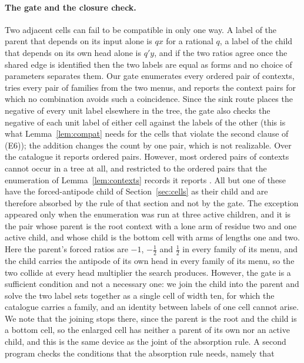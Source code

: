 \documentclass[11pt,a4paper]{article}
\theoremstyle{plain}
\theoremstyle{definition}
\theoremstyle{remark}
\begin{document}
\paragraph{The gate and the closure check.}
Two adjacent cells can fail to be compatible in only one way.  A label of the
parent that depends on its input alone is $qx$ for a rational $q$, a label of
the child that depends on its own head alone is $q'y$, and if the two ratios
agree once the shared edge is identified then the two labels are equal as
forms and no choice of parameters separates them.  Our gate enumerates every
ordered pair of contexts, tries every pair of families from the two menus, and
reports the context pairs for which no combination avoids such a coincidence.
Since the sink route places the negative of every unit label elsewhere in the
tree, the gate also checks the negative of each unit label of either cell
against the labels of the other (this is what Lemma~\ref{lem:compat} needs
for the cells that violate the second clause of (E6)); the addition changes
the count by one pair, which is not realizable.
Over the catalogue it reports \NumGateFail{} ordered pairs.  However, most
ordered pairs of contexts cannot occur in a tree at all, and restricted to the
\NumPairs{} ordered pairs that the enumeration of Lemma~\ref{lem:contexts}
records it reports \NumGateFailRealizable{}.  All but one of these have the
forced-antipode child of Section~\ref{sec:cells} as their child and are
therefore absorbed by the rule of that section and not by the gate.  The
exception appeared only when the enumeration was run at three active children,
and it is the pair whose parent is the root context with a lone arm of
residue two and one active child, and whose child is the bottom cell with arms
of lengths one and two.  Here the parent's forced ratios are $-1$, $-\tfrac12$
and $\tfrac12$ in every family of its menu, and the child carries the antipode
of its own head in every family of its menu, so the two collide at every head
multiplier the search produces.  However, the gate is a sufficient condition
and not a necessary one: we join the child into the parent and solve the two
label sets together as a single cell of width ten, for which the catalogue
carries a family, and an identity between labels of one cell cannot arise.  We
note that the joining stops there, since the parent is the root and the child
is a bottom cell, so the enlarged cell has neither a parent of its own nor an
active child, and this is the same device as the joint of the absorption
rule.  A second
program checks the conditions that the absorption rule needs, namely that
\end{document}
